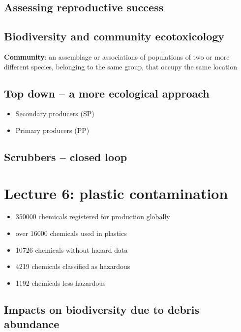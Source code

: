 \subsection{Assessing reproductive success}

\subsection{Biodiversity and community ecotoxicology}

\textbf{Community}: an assemblage or associations of populations of two or more
different species, belonging to the same group, that occupy the same
location

\subsection{Top down -- a more ecological approach}

\begin{itemize}
	\item Secondary producers (SP)
	\item Primary producers (PP)
\end{itemize}

\subsection{Scrubbers -- closed loop}

\section{Lecture 6: plastic contamination}

\begin{itemize}
	\item 350000 chemicals registered for production globally
	\item over 16000 chemicals used in plastics
	\item 10726 chemicals without hazard data
	\item 4219 chemicals classified as hazardous
	\item 1192 chemicals less hazardous
\end{itemize}

\subsection{Impacts on biodiversity due to debris abundance}

